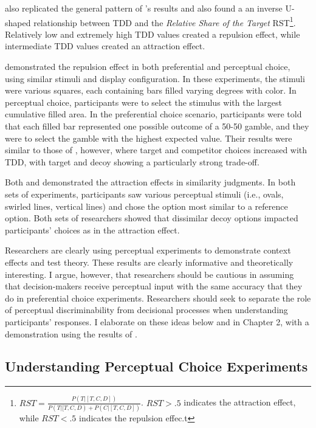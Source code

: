 \textcite{liaoInfluenceDistanceDecoy2021} also replicated the general pattern of \textcite{spektorWhenGoodLooks2018b}'s results and also found a an inverse U-shaped relationship between TDD and the \textit{Relative Share of the Target} RST\footnote{$RST=\frac{P(T|[T,C,D])}{P(T|[T,C,D)+P(C|[T,C,D])}$. $RST>.5$ indicates the attraction effect, while $RST<.5$ indicates the repulsion effec.t}. Relatively low and extremely high TDD values created a repulsion effect, while intermediate TDD values created an attraction effect. 

\textcite{spektorRepulsionEffectPreferential2022} demonstrated the repulsion effect in both preferential and perceptual choice, using similar stimuli and display configuration. In these experiments, the stimuli were various squares, each containing bars filled varying degrees with color. In perceptual choice, participants were to select the stimulus with the largest cumulative filled area. In the preferential choice scenario, participants were told that each filled bar represented one possible outcome of a 50-50 gamble, and they were to select the gamble with the highest expected value. Their results were similar to those of \textcite{spektorWhenGoodLooks2018b}, however, where target and competitor choices increased with TDD, with target and decoy showing a particularly strong trade-off.

Both \textcite{choplinComparisoninducedDecoyEffects2005b} and \textcite{yearsleyContextEffectsSimilarity2022} demonstrated the attraction effects in similarity judgments. In both sets of experiments, participants saw various perceptual stimuli (i.e., ovals, swirled lines, vertical lines) and chose the option most similar to a reference option. Both sets of researchers showed that dissimilar decoy options impacted participants' choices as in the attraction effect.

Researchers are clearly using perceptual experiments to demonstrate context effects and test theory. These results are clearly informative and theoretically interesting. I argue, however, that researchers should be cautious in assuming that decision-makers receive perceptual input with the same accuracy that they do in preferential choice experiments. Researchers should seek to separate the role of perceptual discriminability from decisional processes when understanding participants' responses. I elaborate on these ideas below and in Chapter 2, with a demonstration using the results of \textcite{spektorWhenGoodLooks2018b}.

\subsection{Understanding Perceptual Choice Experiments}

